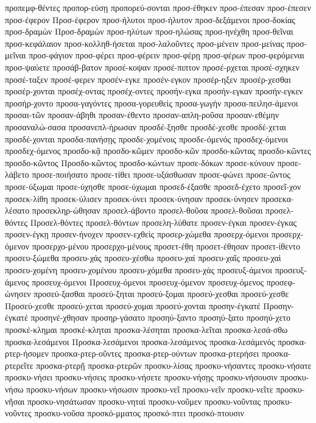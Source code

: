 {προπεμφ-θέντες
προπορ-εύσῃ
προπορεύ-σονται
προσ-έθηκεν
προσ-έπεσαν
προσ-έπεσεν
προσ-έφερον
Προσ-έφερον
προσ-ήλυτοι
προσ-ήλυτον
προσ-δεξάμενοι
προσ-δοκίας
προσ-δραμὼν
Προσ-δραμὼν
προσ-ηλύτων
προσ-ηλώσας
προσ-ηνέχθη
προσ-θεῖναι
προσ-κεφάλαιον
προσ-κολληθ-ήσεται
προσ-λαλοῦντες
προσ-μένειν
προσ-μείνας
προσ-μεῖναι
προσ-φάγιον
προσ-φέρει
προσ-φέρειν
προσ-φέρῃ
προσ-φέρων
προσ-φερόμεναι
προσ-ψαύετε
προσάβ-βατον
προσέ-κοψαν
προσέ-πιπτον
προσέ-ρχεται
προσέ-σχηκεν
προσέ-ταξεν
προσέ-φερεν
προσέν-εγκε
προσέν-εγκον
προσέρ-ηξεν
προσέρ-χεσθαι
προσέρ-χονται
προσέχ-οντας
προσέχ-οντες
προσήν-εγκα
προσήν-εγκαν
προσήν-εγκεν
προσήρ-χοντο
προσα-γαγόντες
προσα-γορευθεὶς
προσα-γωγὴν
προσα-πειλησ-άμενοι
προσαι-τῶν
προσαν-άβηθι
προσαν-έθεντο
προσαν-απλη-ροῦσα
προσαν-εθέμην
προσαναλώ-σασα
προσανεπλ-ήρωσαν
προσδέ-ξησθε
προσδέ-χεσθε
προσδέ-χεται
προσδέ-χονται
προσδα-πανήσῃς
προσδε-χομένοις
προσδε-όμενός
προσδεχ-όμενοι
προσδεχ-όμενος
προσδο-κᾷ
προσδο-κῶμεν
προσδο-κῶν
προσδο-κῶντας
προσδο-κῶντες
προσδο-κῶντος
Προσδο-κῶντος
προσδο-κώντων
προσε-δόκων
προσε-κύνουν
προσε-λάβετο
προσε-ποιήσατο
προσε-τίθει
προσε-υξάσθωσαν
προσε-φώνει
προσε-ῶντος
προσε-ύξωμαι
προσε-ύχησθε
προσε-ύχωμαι
προσεδ-έξασθε
προσεδ-έχετο
προσεῖ-χον
προσεκ-λίθη
προσεκ-ύλισεν
προσεκ-ύνει
προσεκ-ύνησαν
προσεκ-ύνησεν
προσεκα-λέσατο
προσεκληρ-ώθησαν
προσελ-άβοντο
προσελ-θοῦσα
προσελ-θοῦσαι
προσελ-θόντες
Προσελ-θόντες
προσελ-θόντων
προσελη-λύθατε
προσεν-έγκαι
προσεν-έγκας
προσεν-έγκῃ
προσεν-ήνοχεν
προσεν-εχθεὶς
προσερ-χώμεθα
προσερχ-όμενοι
προσερχ-όμενον
προσερχο-μένου
προσερχο-μένους
προσετ-έθη
προσετ-έθησαν
προσετ-ίθεντο
προσευ-ξώμεθα
προσευ-χάς
προσευ-χέσθω
προσευ-χαί
προσευ-χαῖς
προσευ-χαὶ
προσευ-χομένη
προσευ-χομένου
προσευ-χόμεθα
προσευ-χὰς
προσευξ-άμενοι
προσευξ-άμενος
προσευχ-όμενοι
Προσευχ-όμενοι
προσευχ-όμενον
προσευχ-όμενος
προσεφ-ώνησεν
προσεύ-ξασθαι
προσεύ-ξηται
προσεύ-ξομαι
προσεύ-χεσθαι
προσεύ-χεσθε
Προσεύ-χεσθε
προσεύ-χεται
προσεύ-χομαι
προσεύ-χονται
προσην-έγκατέ
Προσην-έγκατέ
προσηνέ-χθησαν
προσηρ-γάσατο
προσηύ-ξαντο
προσηύ-ξατο
προσηύ-χετο
προσκέ-κλημαι
προσκέ-κληται
προσκα-λέσηται
προσκα-λεῖται
προσκα-λεσά-σθω
προσκα-λεσάμενοι
Προσκα-λεσάμενοι
προσκα-λεσάμενος
προσκα-λεσάμενός
προσκα-ρτερ-ήσομεν
προσκα-ρτερ-οῦντες
προσκα-ρτερ-ούντων
προσκα-ρτερήσει
προσκα-ρτερεῖτε
προσκα-ρτερῇ
προσκα-ρτερῶν
προσκυ-λίσας
προσκυ-νήσαντες
προσκυ-νήσατε
προσκυ-νήσει
προσκυ-νήσεις
προσκυ-νήσετε
προσκυ-νήσῃς
προσκυ-νήσουσιν
προσκυ-νήσω
προσκυ-νήσων
προσκυ-νήσωσιν
προσκυ-νεῖ
προσκυ-νεῖν
προσκυ-νεῖτε
προσκυ-νῆσαι
προσκυ-νησάτωσαν
προσκυ-νηταὶ
προσκυ-νοῦμεν
προσκυ-νοῦντας
προσκυ-νοῦντες
προσκυ-νοῦσα
προσκό-μματος
προσκό-πτει
προσκό-πτουσιν
}
